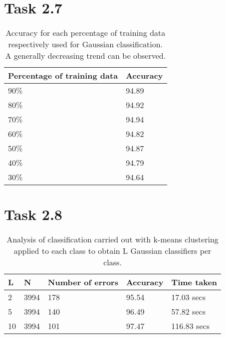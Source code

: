 \documentclass[12pt]{extarticle}
\begin{document}
\section{Task 2.7}
\begin{table}[h!]
\centering
\caption{Accuracy for each percentage of training data respectively used for Gaussian classification. A generally decreasing trend can be observed.}
\begin{tabular}{ |p{3cm}|p{3cm}|  }
 \hline
 Percentage of training data&Accuracy\\
 \hline
 90\%&94.89\\
 80\%&94.92\\
 70\%&94.94\\
 60\%&94.82\\
 50\%&94.87\\
 40\%&94.79\\
 30\%&94.64\\
 \hline
\end{tabular}
\end{table}

\section{Task 2.8}
\begin{table}[h!]
\centering
\caption{Analysis of classification carried out with k-means clustering applied to each class to obtain L Gaussian classifiers per class.}
\begin{tabular}{ |p{3cm}|p{3cm}|p{3cm}|p{3cm}|p{3cm}|  }
 \hline
 L&N&Number of errors&Accuracy&Time taken\\
 \hline
 2&3994&178&95.54&17.03 secs\\
 5&3994&140&96.49&57.82 secs\\
 10&3994&101&97.47&116.83 secs\\
 \hline
\end{tabular}
\end{table}
\end{document}

